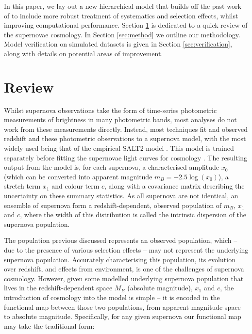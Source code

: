 \documentclass[a4paper,fleqn,usenatbib]{mnras}
\begin{document}
In this paper, we lay out a new hierarchical model that builds off the past work of \citet{Rubin2015} to include more robust treatment of systematics and selection effects, whilst improving computational performance. Section \ref{sec:review} is dedicated to a quick review of the supernovae cosmology. In Section \ref{sec:method} we outline our methodology. Model verification on simulated datasets is given in Section \ref{sec:verification}, along with details on potential areas of improvement.



\section{Review}
\label{sec:review}

Whilst supernova observations take the form of time-series photometric measurements of brightness in many photometric bands, most analyses do not work from these measurements directly. Instead, most techniques fit and observed redshift and these photometric observations to a supernova model, with the most widely used being that of the empirical SALT2 model \citep{Guy2007, Guy2010}. This model is trained separately before fitting the supernovae light curves for cosmology \citep{Guy2010, Mosher2014}. The resulting output from the model is, for each supernova, a characterised amplitude $x_0$ (which can be converted into apparent magnitude $m_B = -2.5\log(x_0)$), a stretch term $x_1$ and colour term $c$, along with a covariance matrix describing the uncertainty on these summary statistics. As all supernova are not identical, an ensemble of supernova form a redshift-dependent, observed population of $m_B$, $x_1$ and $c$, where the width of this distribution is called the intrinsic dispersion of the supernova population.

The population previous discussed represents an observed population, which -- due to the presence of various selection effects -- may not represent the underlying supernova population. Accurately characterising this population, its evolution over redshift, and effects from environment, is one of the challenges of supernova cosmology. However, given some modelled underlying supernova population that lives in the redshift-dependent space $M_B$ (absolute magnitude), $x_1$ and $c$, the introduction of cosmology into the model is simple -- it is encoded in the functional map between those two populations, from apparent magnitude space to absolute magnitude. Specifically, for any given supernova our functional map may take the traditional form:
\end{document}
